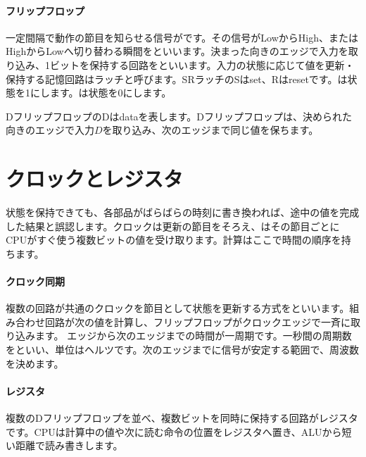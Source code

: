 \par
\endgroup
\medskip
\begingroup
      \centering
      \vspace{4mm}
\paragraph{フリップフロップ}
        一定間隔で動作の節目を知らせる信号がです。その信号がLowからHigh、またはHighからLowへ切り替わる瞬間をといいます。決まった向きのエッジで入力を取り込み、1ビットを保持する回路をといいます。入力の状態に応じて値を更新・保持する記憶回路はラッチと呼びます。SRラッチのSはset、Rはresetです。は状態を1にします。は状態を0にします。

        DフリップフロップのDはdataを表します。Dフリップフロップは、決められた向きのエッジで入力$D$を取り込み、次のエッジまで同じ値を保ちます。

\par
\endgroup
\par
\endgroup


\section{クロックとレジスタ}
\label{sec:01-digital-computer-11}

状態を保持できても、各部品がばらばらの時刻に書き換われば、途中の値を完成した結果と誤認します。クロックは更新の節目をそろえ、はその節目ごとにCPUがすぐ使う複数ビットの値を受け取ります。計算はここで時間の順序を持ちます。

\begingroup
\begingroup
\paragraph{クロック同期}
        複数の回路が共通のクロックを節目として状態を更新する方式をといいます。組み合わせ回路が次の値を計算し、フリップフロップがクロックエッジで一斉に取り込みます。
        エッジから次のエッジまでの時間が一周期です。一秒間の周期数をといい、単位はヘルツです。次のエッジまでに信号が安定する範囲で、周波数を決めます。

\paragraph{レジスタ}
        複数のDフリップフロップを並べ、複数ビットを同時に保持する回路がレジスタです。CPUは計算中の値や次に読む命令の位置をレジスタへ置き、ALUから短い距離で読み書きします。

